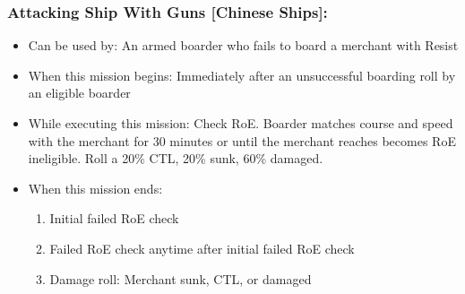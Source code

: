 \documentclass{article}
\begin{document}
    \subsubsection{Attacking Ship With Guns [Chinese Ships]:}
        \begin{itemize}
            \item{Can be used by:} An armed boarder who fails to board a merchant with Resist
            \item{When this mission begins:} Immediately after an unsuccessful boarding roll by an eligible boarder
            \item{While executing this mission:} Check RoE. Boarder matches course and speed with the merchant for 30 minutes or until the merchant reaches becomes RoE ineligible. Roll a 20\% CTL, 20\% sunk, 60\% damaged. 
            \item{When this mission ends:} 
                \begin{enumerate}[label=\arabic*)]
                    \item Initial failed RoE check \par
                    [hunter resumes player assigned mission]
                    \item Failed RoE check anytime after initial failed RoE check \par
                    [hunter transits to base, record merchant damaged]
                    \item Damage roll: Merchant sunk, CTL, or damaged \par
                    [hunter transits to base, record result of merchant]
                \end{enumerate}
        \end{itemize}
\end{document}
